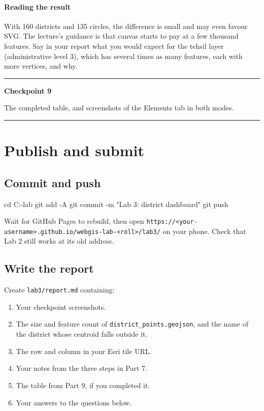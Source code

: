 \documentclass{article}
\newcommand{\cd}[1]{\texttt{#1}}
\newcommand{\cdb}[1]{\nolinkurl{#1}}
\newenvironment{keypoint}[1]
  {\par\vspace{.7em}\noindent\rule{\linewidth}{.6pt}\par\vspace{.15em}
   \noindent\textbf{#1}\par\nobreak\vspace{-.3em}}
  {\par\vspace{.15em}\noindent\rule{\linewidth}{.6pt}\par\vspace{.7em}}
\begin{document}
\paragraph{Reading the result}
With 160 districts and 135 circles, the difference is small and may
even favour SVG. The lecture's guidance is that canvas starts to pay at
a few thousand features. Say in your report what you would expect for
the tehsil layer (administrative level 3), which has several times as
many features, each with more vertices, and why.

\begin{keypoint}{Checkpoint 9}
The completed table, and screenshots of the Elements tab in both modes.
\end{keypoint}


\section{Publish and submit}

\subsection{Commit and push}

\begin{code}
cd C:\webgis-lab
git add -A
git commit -m "Lab 3: district dashboard"
git push
\end{code}

Wait for GitHub Pages to rebuild, then open
\cdb{https://<your-username>.github.io/webgis-lab-<roll>/lab3/} on your
phone. Check that Lab 2 still works at its old address.

\subsection{Write the report}

Create \cd{lab3/report.md} containing:

\begin{enumerate}
  \item Your checkpoint screenshots.
  \item The size and feature count of \cd{district\_points.geojson}, and
        the name of the district whose centroid falls outside it.
  \item The row and column in your Esri tile URL.
  \item Your notes from the three steps in Part 7.
  \item The table from Part 9, if you completed it.
  \item Your answers to the questions below.
\end{enumerate}
\end{document}
